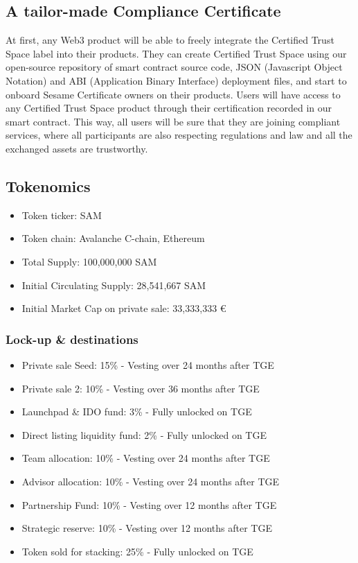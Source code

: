 ﻿\documentclass[a4paper]{article}
\let\OldTexttrademark\texttrademark
\renewcommand{\texttrademark}{\OldTexttrademark\xspace}%
\begin{document}
\subsection{A tailor-made Compliance Certificate} 
At first, any Web3 product will be able to freely integrate the Certified Trust Space\texttrademark label into their products. They can create Certified Trust Space\texttrademark using our open-source repository of smart contract source code, JSON (Javascript Object Notation) and ABI (Application Binary Interface) deployment files, and start to onboard Sesame Certificate owners on their products. Users will have access to any Certified Trust Space\texttrademark product through their certification recorded in our smart contract. This way, all users will be sure that they are joining compliant services, where all participants are also respecting regulations and law and all the exchanged assets are trustworthy.
\subsection{Tokenomics}
\begin{itemize}
\item Token ticker: SAM
\item Token chain: Avalanche C-chain, Ethereum
\item Total Supply: 100,000,000 SAM
\item Initial Circulating Supply: 28,541,667 SAM
\item Initial Market Cap on private sale:  33,333,333 €
\end{itemize}

\subsubsection{Lock-up \& destinations}
\begin{itemize}
\item Private sale Seed: 15\% - Vesting over 24 months after TGE
\item Private sale 2: 10\% - Vesting over 36 months after TGE
\item Launchpad \& IDO fund: 3\% - Fully unlocked on TGE
\item Direct listing liquidity fund: 2\% - Fully unlocked on TGE
\item Team allocation: 10\% - Vesting over 24 months after TGE
\item Advisor allocation: 10\% - Vesting over 24 months after TGE
\item Partnership Fund: 10\% - Vesting over 12 months after TGE
\item Strategic reserve: 10\% - Vesting over 12 months after TGE
\item Token sold for stacking: 25\% - Fully unlocked on TGE
\end{itemize}
\end{document}
